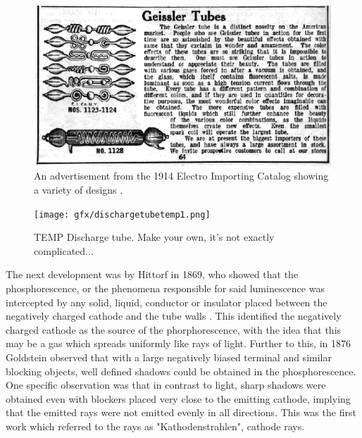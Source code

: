 \begin{figure}
	\centering
	\includegraphics[width=\linewidth]{gfx/geissler1}
	\caption{An advertisement from the 1914 Electro Importing Catalog showing a variety of designs \cite{electro1914}.}
	\label{fig:geissler}
\end{figure}



\begin{figure}
    \centering
    \texttt{[image: gfx/dischargetubetemp1.png]}
    \caption{TEMP Discharge tube. Make your own, it's not exactly complicated...}
    \label{fig:discharge}
\end{figure}

The next development was by Hittorf in 1869, who showed that the phosphorescence, or the phenomena responsible for said luminescence was intercepted by any solid, liquid, conductor or insulator placed between the negatively charged cathode and the tube walls \cite{hittorf:1869}. This identified the negatively charged cathode as the source of the phorphorescence, with the idea that this may be a gas which spreads uniformly like rays of light. Further to this, in 1876 Goldstein observed that with a large negatively biased terminal and similar blocking objects, well defined shadows could be obtained in the phosphorescence. One specific observation was that in contrast to light, sharp shadows were obtained even with blockers placed very close to the emitting cathode, implying that the emitted rays were not emitted evenly in all directions. This was the first work which referred to the rays as "Kathodenstrahlen", cathode rays.

